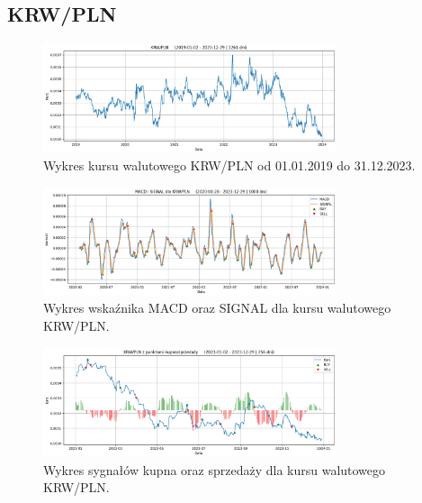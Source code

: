 \documentclass[12pt, a4paper]{article}
\begin{document}
\pagebreak






\subsection{KRW/PLN}

\begin{figure}[ht]
    \centering
    \includegraphics[width=0.77\textwidth]{krw_pln_value.png}
    \caption{Wykres kursu walutowego KRW/PLN od 01.01.2019 do 31.12.2023.}
    \label{fig:all:krw_pln_value}
\end{figure}
\begin{figure}[ht]
    \centering
    \includegraphics[width=0.77\textwidth]{krw_pln_macd_signal.png}
    \caption{Wykres wskaźnika MACD oraz SIGNAL dla kursu walutowego KRW/PLN.}
    \label{fig:all:krw_pln_macd_signal}
\end{figure}
\begin{figure}[ht]
    \centering
    \includegraphics[width=0.77\textwidth]{krw_pln_value_buy_sell.png}
    \caption{Wykres sygnałów kupna oraz sprzedaży dla kursu walutowego KRW/PLN.}
    \label{fig:all:krw_pln_value_buy_sell}
\end{figure}

\pagebreak
\end{document}
